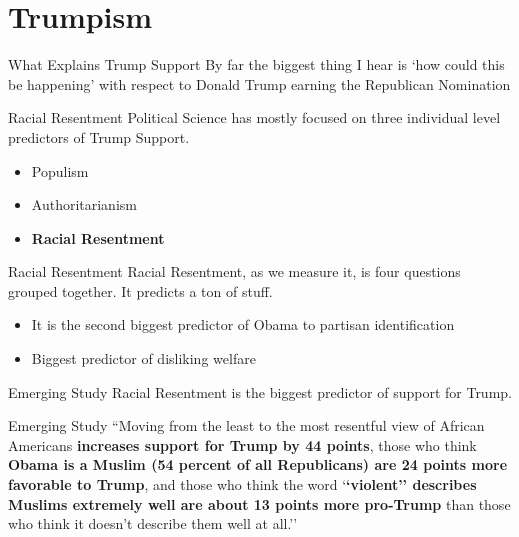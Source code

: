 \documentclass{beamer}
\begin{document}
\section{Trumpism}
\begin{frame}{What Explains Trump Support}
By far the biggest thing I hear is `how could this be happening' with respect to Donald Trump earning the Republican Nomination
\end{frame}
\begin{frame}{Racial Resentment}
Political Science has mostly focused on three individual level predictors of Trump Support.
\begin{itemize}
\item Populism
\item Authoritarianism
\item \textbf{Racial Resentment}
\end{itemize}
\end{frame}
\begin{frame}{Racial Resentment}
Racial Resentment, as we measure it, is four questions grouped together. It predicts a ton of stuff.
\begin{itemize}
\item It is the second biggest predictor of Obama to partisan identification
\item Biggest predictor of disliking welfare
\end{itemize}
\end{frame}
\begin{frame}{Emerging Study}
Racial Resentment is the biggest predictor of support for Trump.
\end{frame}
\begin{frame}{Emerging Study}
``Moving from the least to the most resentful view of African Americans \textbf{increases support for Trump by 44 points}, those who think \textbf{Obama is a Muslim (54 percent of all Republicans) are 24 points more favorable to Trump}, and those who think the word `\textbf{`violent'' describes Muslims extremely well are about 13 points more pro-Trump} than those who think it doesn’t describe them well at all.''

\end{frame}
\end{document}
